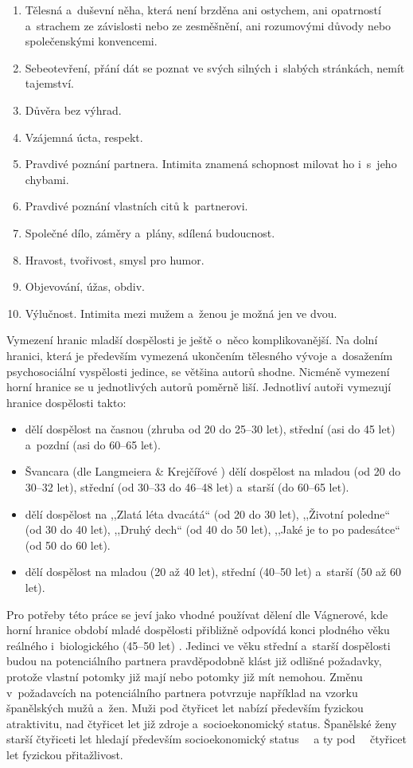 \documentclass[a4paper, 12pt, notitlepage, oneside, numbers=noenddot]{report}
\begin{document}
\begin{enumerate}
\item Tělesná a~duševní něha, která není brzděna ani ostychem, ani
  opatrností a~strachem ze závislosti nebo ze zesměšnění, ani
  rozumovými důvody nebo společenskými konvencemi.
\item Sebeotevření, přání dát se poznat ve svých silných i~slabých
  stránkách, nemít tajemství.
\item Důvěra bez výhrad.
\item Vzájemná úcta, respekt.
\item Pravdivé poznání partnera.  Intimita znamená schopnost milovat
  ho i~s~jeho chybami.
\item Pravdivé poznání vlastních citů k~partnerovi.
\item Společné dílo, záměry a~plány, sdílená budoucnost.
\item Hravost, tvořivost, smysl pro humor.
\item Objevování, úžas, obdiv.
\item Výlučnost.  Intimita mezi mužem a~ženou je možná jen ve dvou.
\end{enumerate}

Vymezení hranic mladší dospělosti je ještě o~něco komplikovanější.  Na
dolní hranici, která je především vymezená ukončením tělesného vývoje
a~dosažením psychosociální vyspělosti jedince, se většina autorů
shodne.  Nicméně vymezení horní hranice se u jednotlivých autorů
poměrně liší.  Jednotliví autoři vymezují hranice dospělosti takto:

\begin{itemize}
\item \citet{LangmeierKrejcirova2007} dělí dospělost na časnou (zhruba
  od 20 do 25--30 let), střední (asi do 45 let) a~pozdní (asi do 60--65
  let).
\item Švancara (dle Langmeiera \& Krejčířové
  \citeyearpar{LangmeierKrejcirova2007}) dělí dospělost na mladou (od
  20 do 30--32 let), střední (od 30--33 do 46--48 let) a~starší (do 60--65
  let).
\item \citet{Rican2006} dělí dospělost na ,,Zlatá léta dvacátá`` (od 20 do
  30 let), ,,Životní poledne`` (od 30 do 40 let), ,,Druhý dech`` (od
  40 do 50 let), ,,Jaké je to po padesátce`` (od 50 do 60 let).
\item \citet{Vagnerova2007} dělí dospělost na mladou (20 až 40 let),
  střední (40--50 let) a~starší (50 až 60 let).
\end{itemize}
Pro potřeby této práce se jeví jako vhodné používat dělení dle
Vágnerové, kde horní hra\-nice období mladé dospělosti přibližně
odpovídá konci plodného věku reálného \citep{CSU2006,CSU2003}
i~biologického (45--50 let) \citep{Rozsypal2003}.  Jedinci ve věku
střední a~starší dospělosti budou na potenciálního partnera
pravděpodobně klást již odlišné požadavky, protože vlastní potomky již
mají nebo potomky již mít nemohou.  Změnu v~požadavcích na
potenciálního partnera potvrzuje například
\citet{Gil-BurmanPelaezSanchez2002} na vzorku španělských mužů a~žen.
Muži pod čtyřicet let nabízí především fyzickou atraktivitu, nad
čtyřicet let již zdroje a~socioekonomický status.  Španělské ženy
starší čtyřiceti let hledají především socioekonomický status ~~a ty
pod~~ čtyřicet let fyzickou přitažlivost.
\end{document}
